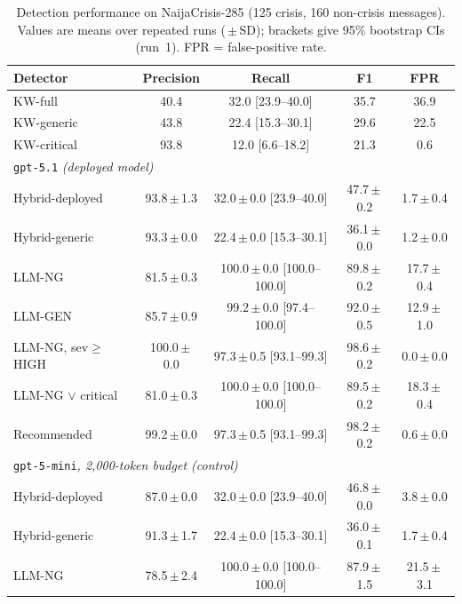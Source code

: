\begin{table}[t]\centering\small
\caption{Detection performance on NaijaCrisis-285 (125 crisis, 160 non-crisis messages). Values are means over repeated runs (\,$\pm$\,SD); brackets give 95\% bootstrap CIs (run~1). FPR = false-positive rate.}
\label{tab:main}
\begin{tabular}{lcccc}\toprule
Detector & Precision & Recall & F1 & FPR \\\midrule
KW-full & 40.4 & 32.0 {\scriptsize[23.9--40.0]} & 35.7 & 36.9 \\
KW-generic & 43.8 & 22.4 {\scriptsize[15.3--30.1]} & 29.6 & 22.5 \\
KW-critical & 93.8 & 12.0 {\scriptsize[6.6--18.2]} & 21.3 & 0.6 \\
\midrule\multicolumn{5}{l}{\texttt{gpt-5.1} \textit{(deployed model)}}\\
Hybrid-deployed & 93.8\,$\pm$\,1.3 & 32.0\,$\pm$\,0.0 {\scriptsize[23.9--40.0]} & 47.7\,$\pm$\,0.2 & 1.7\,$\pm$\,0.4 \\
Hybrid-generic & 93.3\,$\pm$\,0.0 & 22.4\,$\pm$\,0.0 {\scriptsize[15.3--30.1]} & 36.1\,$\pm$\,0.0 & 1.2\,$\pm$\,0.0 \\
LLM-NG & 81.5\,$\pm$\,0.3 & 100.0\,$\pm$\,0.0 {\scriptsize[100.0--100.0]} & 89.8\,$\pm$\,0.2 & 17.7\,$\pm$\,0.4 \\
LLM-GEN & 85.7\,$\pm$\,0.9 & 99.2\,$\pm$\,0.0 {\scriptsize[97.4--100.0]} & 92.0\,$\pm$\,0.5 & 12.9\,$\pm$\,1.0 \\
LLM-NG, sev$\geq$HIGH & 100.0\,$\pm$\,0.0 & 97.3\,$\pm$\,0.5 {\scriptsize[93.1--99.3]} & 98.6\,$\pm$\,0.2 & 0.0\,$\pm$\,0.0 \\
LLM-NG $\lor$ critical & 81.0\,$\pm$\,0.3 & 100.0\,$\pm$\,0.0 {\scriptsize[100.0--100.0]} & 89.5\,$\pm$\,0.2 & 18.3\,$\pm$\,0.4 \\
Recommended & 99.2\,$\pm$\,0.0 & 97.3\,$\pm$\,0.5 {\scriptsize[93.1--99.3]} & 98.2\,$\pm$\,0.2 & 0.6\,$\pm$\,0.0 \\
\midrule\multicolumn{5}{l}{\texttt{gpt-5-mini}\textit{, 2{,}000-token budget (control)}}\\
Hybrid-deployed & 87.0\,$\pm$\,0.0 & 32.0\,$\pm$\,0.0 {\scriptsize[23.9--40.0]} & 46.8\,$\pm$\,0.0 & 3.8\,$\pm$\,0.0 \\
Hybrid-generic & 91.3\,$\pm$\,1.7 & 22.4\,$\pm$\,0.0 {\scriptsize[15.3--30.1]} & 36.0\,$\pm$\,0.1 & 1.7\,$\pm$\,0.4 \\
LLM-NG & 78.5\,$\pm$\,2.4 & 100.0\,$\pm$\,0.0 {\scriptsize[100.0--100.0]} & 87.9\,$\pm$\,1.5 & 21.5\,$\pm$\,3.1 \\

\end{tabular}
\end{table}
